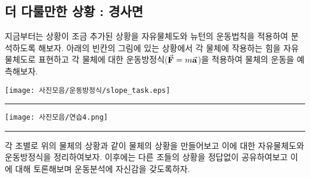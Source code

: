 

\subsection{더 다룰만한 상황 : 경사면}
\begin{flushleft}
  
지금부터는 상황이 조금 추가된 상황을 자유물체도와 뉴턴의 운동법칙을 적용하여 분석하도록 해보자. 아래의 빈칸의 그림에 있는 상황에서 각 물체에
작용하는 힘을 자유물체도로 표현하고 각 물체에 대한 운동방정식($\va{F}=m\va{a}$)을 적용하여 물체의 운동을 예측해보자. 



\begin{task}
    \begin{flushleft}
  {
  {\texttt{[image: 사진모음/운동방정식/slope\_task.eps]}
  \label{fig:빗면}}%
  {\rule{\linewidth}{4cm}}}
 \end{flushleft}
\end{task}


\begin{task}
  \begin{flushleft}
    {
    {\texttt{[image: 사진모음/연습4.png]}
  \label{fig:물체위의물체}}%
    {\rule{\linewidth}{4cm}}}
   \end{flushleft}
\end{task}


\begin{task} 
  각 조별로 위의 물체의 상황과 같이 물체의 상황을 만들어보고 
  이에 대한 자유물체도와 운동방정식을 정리하여보자. 
  이후에는 다른 조들의 상황을 정답없이 공유하여보고 이에 대해
  토론해보며 운동분석에 자신감을 갖도록하자. 
\end{task}

    \end{flushleft}     

 